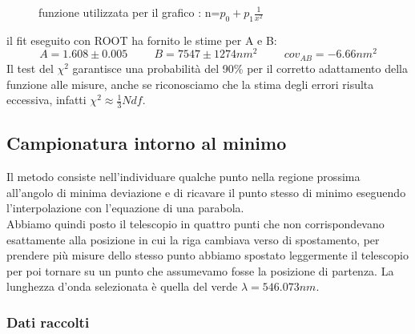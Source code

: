\documentclass[a4paper]{article}
\theoremstyle{definition}
\begin{document}
\begin{figure}[!ht]
    	\captionsetup{labelformat=empty}

	\caption{funzione utilizzata per il grafico : n=$p_{0}+p_{1}\frac{1}{x^{2}}$}
\end{figure}
il fit eseguito con ROOT ha fornito le stime per A e B:
\[ A =1.608\pm 0.005\hspace{1cm} B = 7547 \pm 1274 nm^{2} \hspace{1cm} cov_{AB} = -6.66 nm^{2}\]
Il test del \(\chi^{2}\) garantisce una probabilità del 90\% per il corretto adattamento della funzione alle misure, anche se riconosciamo che la stima degli errori risulta eccessiva, infatti \(\chi^{2} \approx \frac{1}{3} Ndf\).
\pagebreak

\subsection{Campionatura intorno al minimo}
Il metodo consiste nell'individuare qualche punto nella regione prossima all'angolo di minima deviazione e di ricavare il punto stesso di minimo eseguendo l'interpolazione con l'equazione di una parabola.\\
\noindent Abbiamo quindi posto il telescopio in quattro punti che non corrispondevano esattamente alla posizione in cui la riga cambiava verso di spostamento, per prendere più misure dello stesso punto abbiamo spostato leggermente il telescopio per poi tornare su un punto che assumevamo fosse la posizione di partenza.
La lunghezza d'onda selezionata è quella del verde \(\lambda = 546.073nm\).

\subsubsection{Dati raccolti}
\end{document}

